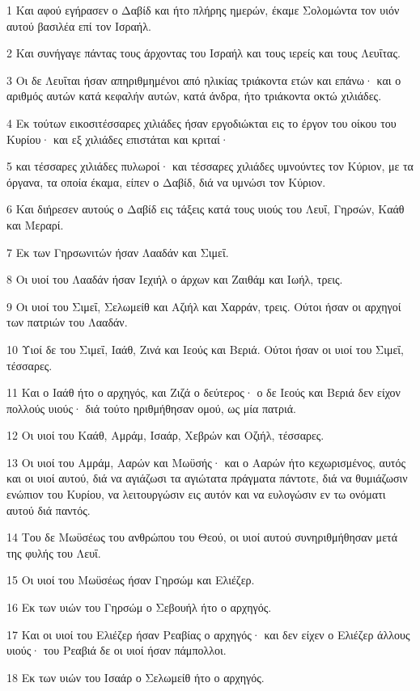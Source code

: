 \par 1 Και αφού εγήρασεν ο Δαβίδ και ήτο πλήρης ημερών, έκαμε Σολομώντα τον υιόν αυτού βασιλέα επί τον Ισραήλ.
\par 2 Και συνήγαγε πάντας τους άρχοντας του Ισραήλ και τους ιερείς και τους Λευΐτας.
\par 3 Οι δε Λευΐται ήσαν απηριθμημένοι από ηλικίας τριάκοντα ετών και επάνω· και ο αριθμός αυτών κατά κεφαλήν αυτών, κατά άνδρα, ήτο τριάκοντα οκτώ χιλιάδες.
\par 4 Εκ τούτων εικοσιτέσσαρες χιλιάδες ήσαν εργοδιώκται εις το έργον του οίκου του Κυρίου· και εξ χιλιάδες επιστάται και κριταί·
\par 5 και τέσσαρες χιλιάδες πυλωροί· και τέσσαρες χιλιάδες υμνούντες τον Κύριον, με τα όργανα, τα οποία έκαμα, είπεν ο Δαβίδ, διά να υμνώσι τον Κύριον.
\par 6 Και διήρεσεν αυτούς ο Δαβίδ εις τάξεις κατά τους υιούς του Λευΐ, Γηρσών, Καάθ και Μεραρί.
\par 7 Εκ των Γηρσωνιτών ήσαν Λααδάν και Σιμεΐ.
\par 8 Οι υιοί του Λααδάν ήσαν Ιεχιήλ ο άρχων και Ζαιθάμ και Ιωήλ, τρεις.
\par 9 Οι υιοί του Σιμεΐ, Σελωμείθ και Αζιήλ και Χαρράν, τρεις. Ούτοι ήσαν οι αρχηγοί των πατριών του Λααδάν.
\par 10 Υιοί δε του Σιμεΐ, Ιαάθ, Ζινά και Ιεούς και Βεριά. Ούτοι ήσαν οι υιοί του Σιμεΐ, τέσσαρες.
\par 11 Και ο Ιαάθ ήτο ο αρχηγός, και Ζιζά ο δεύτερος· ο δε Ιεούς και Βεριά δεν είχον πολλούς υιούς· διά τούτο ηριθμήθησαν ομού, ως μία πατριά.
\par 12 Οι υιοί του Καάθ, Αμράμ, Ισαάρ, Χεβρών και Οζιήλ, τέσσαρες.
\par 13 Οι υιοί του Αμράμ, Ααρών και Μωϋσής· και ο Ααρών ήτο κεχωρισμένος, αυτός και οι υιοί αυτού, διά να αγιάζωσι τα αγιώτατα πράγματα πάντοτε, διά να θυμιάζωσιν ενώπιον του Κυρίου, να λειτουργώσιν εις αυτόν και να ευλογώσιν εν τω ονόματι αυτού διά παντός.
\par 14 Του δε Μωϋσέως του ανθρώπου του Θεού, οι υιοί αυτού συνηριθμήθησαν μετά της φυλής του Λευΐ.
\par 15 Οι υιοί του Μωϋσέως ήσαν Γηρσώμ και Ελιέζερ.
\par 16 Εκ των υιών του Γηρσώμ ο Σεβουήλ ήτο ο αρχηγός.
\par 17 Και οι υιοί του Ελιέζερ ήσαν Ρεαβίας ο αρχηγός· και δεν είχεν ο Ελιέζερ άλλους υιούς· του Ρεαβιά δε οι υιοί ήσαν πάμπολλοι.
\par 18 Εκ των υιών του Ισαάρ ο Σελωμείθ ήτο ο αρχηγός.
